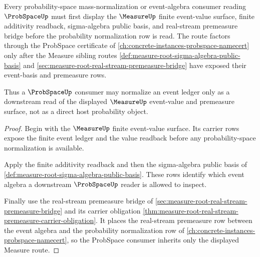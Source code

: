 \begin{theorem}
\label{thm:measure-probspace-event-algebra-forward-route}
Every probability-space mass-normalization or event-algebra consumer reading $\ProbSpaceUp$ must first display the $\MeasureUp$ finite event-value surface, finite additivity readback, sigma-algebra public basis, and real-stream premeasure bridge before the probability normalization row is read. The route factors through the ProbSpace certificate of \autoref{ch:concrete-instances-probspace-namecert} only after the Measure sibling routes \autoref{def:measure-root-sigma-algebra-public-basis} and \autoref{sec:measure-root-real-stream-premeasure-bridge} have exposed their event-basis and premeasure rows.

Thus a $\ProbSpaceUp$ consumer may normalize an event ledger only as a downstream read of the displayed $\MeasureUp$ event-value and premeasure surface, not as a direct host probability object.
\end{theorem}
\begin{proof}
Begin with the $\MeasureUp$ finite event-value surface. Its carrier rows expose the finite event ledger and the value readback before any probability-space normalization is available.

Apply the finite additivity readback and then the sigma-algebra public basis of \autoref{def:measure-root-sigma-algebra-public-basis}. These rows identify which event algebra a downstream $\ProbSpaceUp$ reader is allowed to inspect.

Finally use the real-stream premeasure bridge of \autoref{sec:measure-root-real-stream-premeasure-bridge} and its carrier obligation \autoref{thm:measure-root-real-stream-premeasure-carrier-obligation}. It places the real-stream premeasure row between the event algebra and the probability normalization row of \autoref{ch:concrete-instances-probspace-namecert}, so the ProbSpace consumer inherits only the displayed Measure route.
\end{proof}
